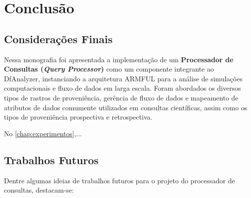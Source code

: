 
\chapter{Conclusão}%
\label{chap:conclusao}

\section{Considerações Finais}

Nessa monografia foi apresentada a implementação de um \textbf{Processador de Consultas (\textit{Query Processor})} como um componente integrante ao DfAnalyzer, instanciando a arquitetura ARMFUL para a análise de simulações computacionais e fluxo de dados em larga escala. Foram abordados os diversos tipos de rastros de proveniência, gerência de fluxo de dados e mapeamento de atributos de dados comumente utilizados em consultas científicas, assim como os tipos de proveniência prospectiva e retrospectiva.

No \autoref{chap:experimentos},...


\section{Trabalhos Futuros}

Dentre algumas ideias de trabalhos futuros para o projeto do processador de consultas, destacam-se:

